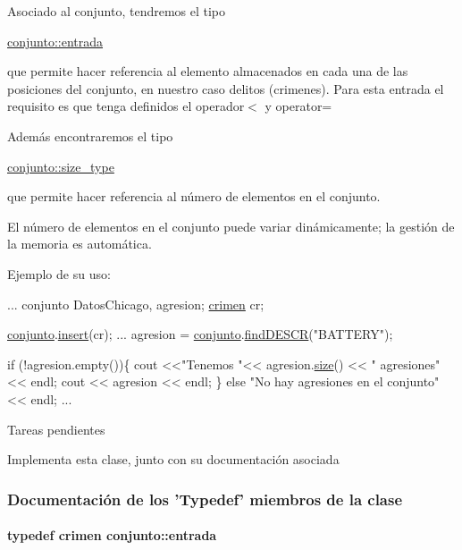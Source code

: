 Asociado al conjunto, tendremos el tipo
\begin{DoxyCode}
\hyperlink{classcrimen}{conjunto::entrada} 
\end{DoxyCode}
 que permite hacer referencia al elemento almacenados en cada una de las posiciones del conjunto, en nuestro caso delitos (crimenes). Para esta entrada el requisito es que tenga definidos el operador$<$ y operator=

Además encontraremos el tipo
\begin{DoxyCode}
\hyperlink{classconjunto_a855a5893bb0f5a851ab2dbf2b8aa6cc7}{conjunto::size\_type} 
\end{DoxyCode}
 que permite hacer referencia al número de elementos en el conjunto.

El número de elementos en el conjunto puede variar dinámicamente; la gestión de la memoria es automática.

Ejemplo de su uso\+: 
\begin{DoxyCode}
...
conjunto DatosChicago, agresion;
\hyperlink{classcrimen}{crimen} cr;

\hyperlink{classconjunto}{conjunto}.\hyperlink{classconjunto_aa65b9f7c4cb9bad6d4e40c1973095930}{insert}(cr);
...
agresion = \hyperlink{classconjunto}{conjunto}.\hyperlink{classconjunto_afff3e7f4b3d00f422dd7ab2fec935378}{findDESCR}(\textcolor{stringliteral}{"BATTERY"});

\textcolor{keywordflow}{if} (!agresion.empty())\{
 cout <<\textcolor{stringliteral}{"Tenemos "}<< agresion.\hyperlink{classconjunto_a863e1e106e35adda47e7c5e2067295b9}{size}() << \textcolor{stringliteral}{" agresiones"} << endl;
 cout << agresion << endl;
\} \textcolor{keywordflow}{else} \textcolor{stringliteral}{"No hay agresiones en el conjunto"} << endl;
...
\end{DoxyCode}
 \begin{DoxyRefDesc}{Tareas pendientes}
\item[\hyperlink{todo__todo000003}{Tareas pendientes}]Implementa esta clase, junto con su documentación asociada \end{DoxyRefDesc}


\subsubsection{Documentación de los 'Typedef' miembros de la clase}
\hypertarget{classconjunto_a09cad766dd65de73e51eae21f9d22585}{
\paragraph[{entrada}]{\setlength{\rightskip}{0pt plus 5cm}typedef {\bf crimen} {\bf conjunto\+::entrada}}}\label{classconjunto_a09cad766dd65de73e51eae21f9d22585}


